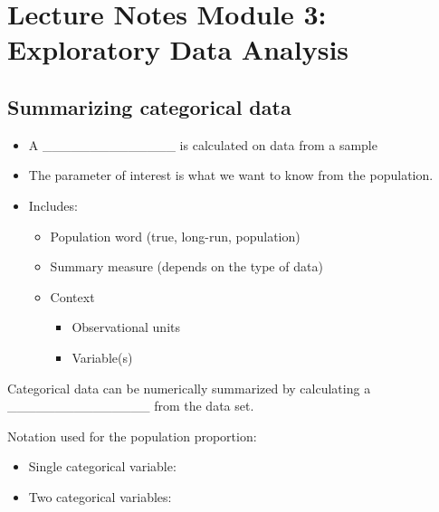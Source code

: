 \documentclass[
]{report}
\providecommand{\tightlist}{%
  \setlength{\itemsep}{0pt}\setlength{\parskip}{0pt}}
\begin{document}
\hypertarget{lecture-notes-module-3-exploratory-data-analysis}{%
\section{Lecture Notes Module 3: Exploratory Data Analysis}\label{lecture-notes-module-3-exploratory-data-analysis}}


\hypertarget{summarizing-categorical-data}{%
\subsection*{Summarizing categorical data}\label{summarizing-categorical-data}}

\begin{itemize}
\item
  A \_\_\_\_\_\_\_\_\_\_\_\_\_\_ is calculated on data from a sample
\item
  The parameter of interest is what we want to know from the population.
\item
  Includes:

  \begin{itemize}
  \item
    Population word (true, long-run, population)
  \item
    Summary measure (depends on the type of data)
  \item
    Context

    \begin{itemize}
    \item
      Observational units
    \item
      Variable(s)
    \end{itemize}
  \end{itemize}
\end{itemize}

Categorical data can be numerically summarized by calculating a \_\_\_\_\_\_\_\_\_\_\_\_\_\_\_ from the data set.

Notation used for the population proportion:

\begin{itemize}
\tightlist
\item
  Single categorical variable:
\end{itemize}

\vspace{0.2in}

\begin{itemize}
\tightlist
\item
  Two categorical variables:
\end{itemize}
\end{document}
